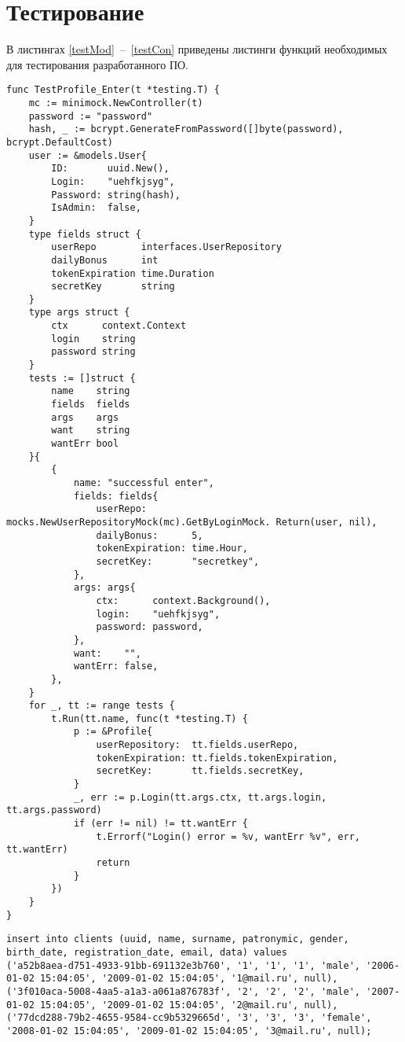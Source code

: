 \begin{appendices}
\label{appendix:graph}
	\chapter{Тестирование}
	
	В листингах \ref{testMod}~--~\ref{testCon} приведены листинги функций необходимых для тестирования разработанного ПО.
	
	\begin{lstlisting}[label=testMod,caption=Модульный тест для функции входа в систему]
func TestProfile_Enter(t *testing.T) {
	mc := minimock.NewController(t)
	password := "password"
	hash, _ := bcrypt.GenerateFromPassword([]byte(password), bcrypt.DefaultCost)
	user := &models.User{
		ID:       uuid.New(),
		Login:    "uehfkjsyg",
		Password: string(hash),
		IsAdmin:  false,
	}
	type fields struct {
		userRepo        interfaces.UserRepository
		dailyBonus      int
		tokenExpiration time.Duration
		secretKey       string
	}
	type args struct {
		ctx      context.Context
		login    string
		password string
	}
	tests := []struct {
		name    string
		fields  fields
		args    args
		want    string
		wantErr bool
	}{
		{
			name: "successful enter",
			fields: fields{
				userRepo:        mocks.NewUserRepositoryMock(mc).GetByLoginMock. Return(user, nil),
				dailyBonus:      5,
				tokenExpiration: time.Hour,
				secretKey:       "secretkey",
			},
			args: args{
				ctx:      context.Background(),
				login:    "uehfkjsyg",
				password: password,
			},
			want:    "",
			wantErr: false,
		},
	}
	for _, tt := range tests {
		t.Run(tt.name, func(t *testing.T) {
			p := &Profile{
				userRepository:  tt.fields.userRepo,
				tokenExpiration: tt.fields.tokenExpiration,
				secretKey:       tt.fields.secretKey,
			}
			_, err := p.Login(tt.args.ctx, tt.args.login, tt.args.password)
			if (err != nil) != tt.wantErr {
				t.Errorf("Login() error = %v, wantErr %v", err, tt.wantErr)
				return
			}
		})
	}
}
	\end{lstlisting}
	
	\begin{lstlisting}[label=testBD,caption=SQL-скрипт заполнения БД тестовыми данными используемыми в интеграционных тестах]
insert into clients (uuid, name, surname, patronymic, gender, birth_date, registration_date, email, data) values
('a52b8aea-d751-4933-91bb-691132e3b760', '1', '1', '1', 'male', '2006-01-02 15:04:05', '2009-01-02 15:04:05', '1@mail.ru', null),
('3f010aca-5008-4aa5-a1a3-a061a876783f', '2', '2', '2', 'male', '2007-01-02 15:04:05', '2009-01-02 15:04:05', '2@mail.ru', null),
('77dcd288-79b2-4655-9584-cc9b5329665d', '3', '3', '3', 'female', '2008-01-02 15:04:05', '2009-01-02 15:04:05', '3@mail.ru', null);
	\end{lstlisting}
	

\end{appendices}
